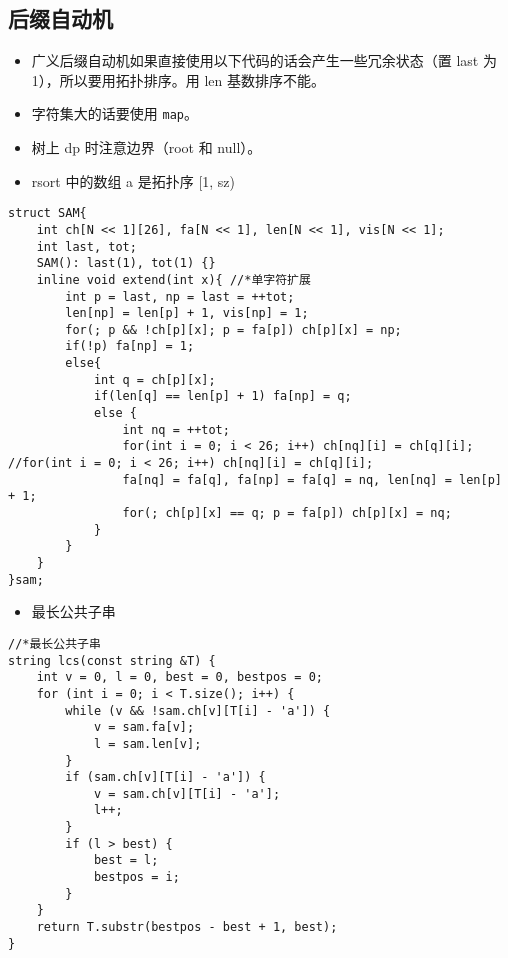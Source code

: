 \documentclass[]{article}
\providecommand{\tightlist}{%
  \setlength{\itemsep}{0pt}\setlength{\parskip}{0pt}}
\begin{document}
\hypertarget{ux540eux7f00ux81eaux52a8ux673a}{%
\subsection{后缀自动机}\label{ux540eux7f00ux81eaux52a8ux673a}}

\begin{itemize}
\tightlist
\item
  广义后缀自动机如果直接使用以下代码的话会产生一些冗余状态（置 last 为
  1），所以要用拓扑排序。用 len 基数排序不能。
\item
  字符集大的话要使用 \texttt{map}。
\item
  树上 dp 时注意边界（root 和 null）。
\item
  rsort 中的数组 a 是拓扑序 {[}1, sz)
\end{itemize}

\begin{verbatim}
struct SAM{
    int ch[N << 1][26], fa[N << 1], len[N << 1], vis[N << 1];
    int last, tot;
    SAM(): last(1), tot(1) {}
    inline void extend(int x){ //*单字符扩展
        int p = last, np = last = ++tot;
        len[np] = len[p] + 1, vis[np] = 1;
        for(; p && !ch[p][x]; p = fa[p]) ch[p][x] = np;
        if(!p) fa[np] = 1;
        else{
            int q = ch[p][x];
            if(len[q] == len[p] + 1) fa[np] = q;
            else {
                int nq = ++tot;
                for(int i = 0; i < 26; i++) ch[nq][i] = ch[q][i]; //for(int i = 0; i < 26; i++) ch[nq][i] = ch[q][i];
                fa[nq] = fa[q], fa[np] = fa[q] = nq, len[nq] = len[p] + 1;
                for(; ch[p][x] == q; p = fa[p]) ch[p][x] = nq;
            }
        }
    }
}sam;
\end{verbatim}

\begin{itemize}
\tightlist
\item
  最长公共子串
\end{itemize}

\begin{verbatim}
//*最长公共子串
string lcs(const string &T) {
    int v = 0, l = 0, best = 0, bestpos = 0;
    for (int i = 0; i < T.size(); i++) {
        while (v && !sam.ch[v][T[i] - 'a']) {
            v = sam.fa[v];
            l = sam.len[v];
        }   
        if (sam.ch[v][T[i] - 'a']) {
            v = sam.ch[v][T[i] - 'a'];
            l++;
        }
        if (l > best) {
            best = l;
            bestpos = i;
        }
    }
    return T.substr(bestpos - best + 1, best);
}
\end{verbatim}
\end{document}
